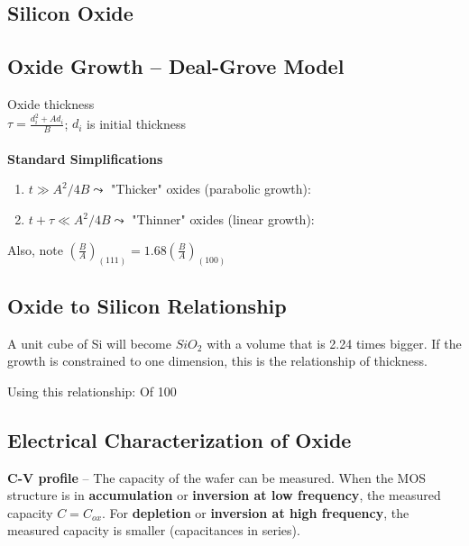 \documentclass[6pt,letterpaper]{scrartcl}
\begin{document}
\begin{multicols}{3}
\section{Silicon Oxide}
\subsection{Oxide Growth -- Deal-Grove Model}
Oxide thickness  \\ $\tau = \frac{d_i^2 + A d_i}{B}$; $d_i$ is initial thickness \\
\\
\vspace{0.2cm}
\textbf{Standard Simplifications}
\vspace{-0.4cm}
\begin{enumerate}
	\item $t \gg A^2/4B \leadsto$ "Thicker" oxides (parabolic growth): 
	\item \vspace{-0.1cm} $t+\tau \ll A^2/4B \leadsto$ "Thinner" oxides (linear growth): 
\end{enumerate}
Also, note $\left( \frac{B}{A} \right)_{(111)} = 1.68 \left( \frac{B}{A} \right)_{(100)}$

\subsection{Oxide to Silicon Relationship}
A unit cube of Si will become $SiO_2$ with a volume that is 2.24 times bigger. If the growth is constrained to one dimension, this is the relationship of thickness.

Using this relationship: Of 100%

\subsection{Electrical Characterization of Oxide}
\textbf{C-V profile} -- The capacity of the wafer can be measured. When the MOS structure is in \textbf{accumulation} or \textbf{inversion at low frequency}, the measured capacity $C = C_{ox}$. For \textbf{depletion} or \textbf{inversion at high frequency}, the measured capacity is smaller (capacitances in series).


\end{multicols}
\end{document}
